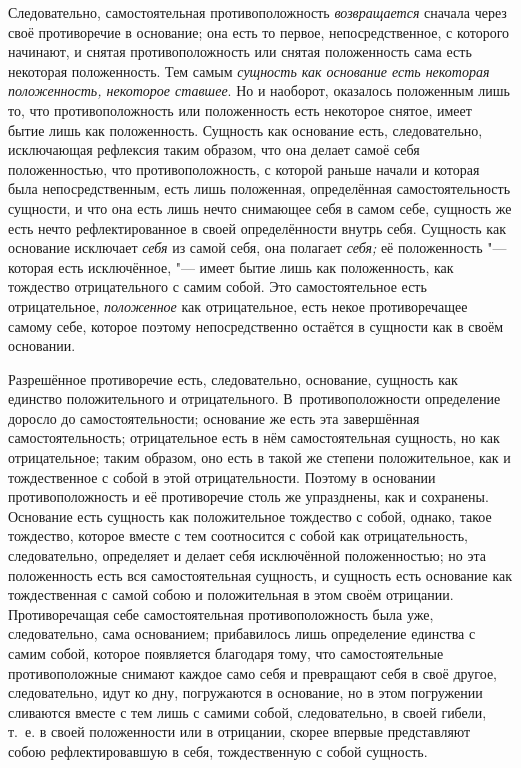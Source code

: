 Следовательно, самостоятельная противоположность
{\em возвращается} сначала через своё противоречие в
основание; она есть то первое, непосредственное, с которого начинают, и
снятая противоположность или снятая положенность сама есть некоторая
положенность. Тем самым {\em сущность как основание
есть некоторая положенность, некоторое ставшее}. Но и наоборот, оказалось
положенным лишь то, что противоположность или положенность есть некоторое
снятое, имеет бытие лишь как положенность. Сущность как основание есть,
следовательно, исключающая рефлексия таким образом, что она делает самоё
себя положенностью, что противоположность, с которой раньше начали и
которая была непосредственным, есть лишь положенная, определённая
самостоятельность сущности, и что она есть лишь нечто снимающее себя в
самом себе, сущность же есть нечто рефлектированное в своей определённости
внутрь себя. Сущность как основание исключает
{\em себя} из самой себя, она полагает
{\em себя;} её положенность "--- которая есть исключённое,
"--- имеет бытие лишь как положенность, как тождество отрицательного с самим
собой. Это самостоятельное есть отрицательное,
{\em положенное} как отрицательное, есть некое
противоречащее самому себе, которое поэтому непосредственно остаётся в
сущности как в своём основании.

Разрешённое противоречие есть, следовательно, основание, сущность как
единство положительного и отрицательного. В~противоположности определение
доросло до самостоятельности; основание же есть эта завершённая
самостоятельность; отрицательное есть в нём самостоятельная сущность, но
как отрицательное; таким образом, оно есть в такой же степени
положительное, как и тождественное с собой в этой отрицательности. Поэтому
в основании противоположность и её противоречие столь же упразднены, как и
сохранены. Основание есть сущность как положительное тождество с собой,
однако, такое тождество, которое вместе с тем соотносится с собой как
отрицательность, следовательно, определяет и делает себя исключённой
положенностью; но эта положенность есть вся самостоятельная сущность, и
сущность есть основание как тождественная с самой собою и положительная в
этом своём отрицании. Противоречащая себе самостоятельная противоположность
была уже, следовательно, сама основанием; прибавилось лишь определение
единства с самим собой, которое появляется благодаря тому, что
самостоятельные противоположные снимают каждое само себя и превращают себя
в своё другое, следовательно, идут ко дну, погружаются в основание, но в
этом погружении сливаются вместе с тем лишь с самими собой, следовательно,
в своей гибели, т.~е. в своей положенности или в отрицании, скорее впервые
представляют собою рефлектировавшую в себя, тождественную с собой сущность.

